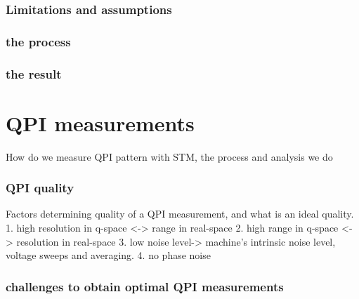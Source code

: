\subsubsection{Limitations and assumptions}


\subsubsection{the process}
\subsubsection{the result}


\section{QPI measurements}
How do we measure QPI pattern with STM, the process and analysis we do 
\subsubsection{QPI quality}
Factors determining quality of a QPI measurement, and what is an ideal quality. 
1. high resolution in q-space <-> range in real-space
2. high range in q-space <-> resolution in real-space
3. low noise level-> machine's intrinsic noise level, voltage sweeps and averaging.
4. no phase noise 
\subsubsection{challenges to obtain optimal QPI measurements}
 
